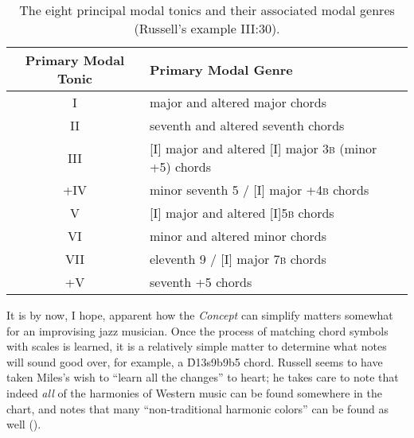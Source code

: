 \begin{table}[tb]
  \centering
  \vspace{1em}
  \begin{tabular}{cl}
   Primary Modal Tonic & Primary Modal Genre \\
   \hline
   \rule[1em]{0ex}{1ex}%
   I    & major and altered major chords \\
   II   & seventh and altered seventh chords \\
   III  & [I] major and altered [I] major 3\textsc{b} (minor +5) chords \\
   +IV  & minor seventh \flat{}5 / [I] major +4\textsc{b} chords \\
   V    & [I] major and altered [I]5\textsc{b} chords \\
   VI   & minor and altered minor chords \\
   VII  & eleventh \flat{}9 / [I] major 7\textsc{b} chords \\
   +V   &  seventh +5 chords
  \end{tabular}
  \caption[The eight principal modal tonics and their associated modal
    genres.]{The eight principal modal tonics and their associated modal genres
    (Russell's example III:30).}
  \label{lcc:lydian-pmgs}
\end{table}

It is by now, I hope, apparent how the \emph{Concept} can simplify matters
somewhat for an improvising jazz musician. Once the process of matching chord
symbols with scales is learned, it is a relatively simple matter to determine
what notes will sound good over, for example, a \h{D13s9b9b5} chord. Russell
seems to have taken Miles's wish to ``learn all the changes'' to heart; he
takes care to note that indeed \emph{all} of the harmonies of Western music
can be found somewhere in the chart, and notes that many ``non-traditional
harmonic colors'' can be found as well ().


